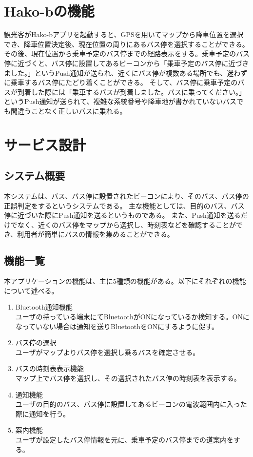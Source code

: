 \documentclass[openany,11pt,papersize]{jsbook}
\begin{document}
\section{Hako-bの機能}
観光客がHako-bアプリを起動すると、GPSを用いてマップから降車位置を選択でき、降車位置決定後、現在位置の周りにあるバス停を選択することができる。
その後、現在位置から乗車予定のバス停までの経路表示をする。乗車予定のバス停に近づくと、バス停に設置してあるビーコンから「乗車予定のバス停に近づきました。」というPush通知が送られ、近くにバス停が複数ある場所でも、迷わずに乗車するバス停にたどり着くことができる。
そして、バス停に乗車予定のバスが到着した際には「乗車するバスが到着しました。バスに乗ってください。」というPush通知が送られて、複雑な系統番号や降車地が書かれていないバスでも間違うことなく正しいバスに乗れる。

\section{サービス設計}

\subsection{システム概要}
本システムは、バス、バス停に設置されたビーコンにより、そのバス、バス停の正誤判定をするというシステムである。
主な機能としては、目的のバス、バス停に近づいた際にPush通知を送るというものである。
また、Push通知を送るだけでなく、近くのバス停をマップから選択し、時刻表などを確認することができ、利用者が簡単にバスの情報を集めることができる。


\subsection{機能一覧}
本アプリケーションの機能は、主に5種類の機能がある。以下にそれぞれの機能について述べる。
\begin{enumerate}

\item Bluetooth通知機能\\
ユーザの持っている端末にてBluetoothがONになっているか検知する。ONになっていない場合は通知を送りBluetoothをONにするように促す。
\item バス停の選択\\
ユーザがマップよりバス停を選択し乗るバスを確定させる。
\item バスの時刻表表示機能\mbox{}\\
マップ上でバス停を選択し、その選択されたバス停の時刻表を表示する。
\item 通知機能\mbox{}\\
ユーザの目的のバス、バス停に設置してあるビーコンの電波範囲内に入った際に通知を行う。
\item 案内機能\mbox{}\\
ユーザが設定したバス停情報を元に、乗車予定のバス停までの道案内をする。

\end{enumerate}
\end{document}
